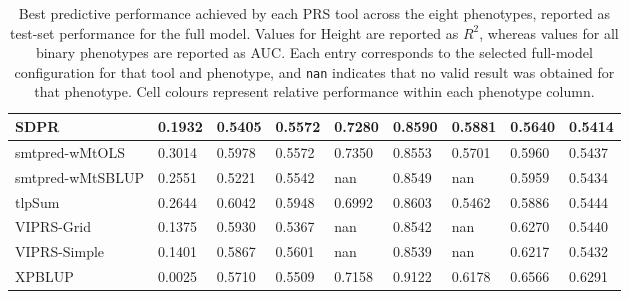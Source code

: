 \documentclass[pdflatex,sn-basic]{sn-jnl}
\begin{document}
\begin{table}[!ht]
{\begin{tabular}{|l|l|l|l|l|l|l|l|l|}
\hline
SDPR \cite{Zhou_2021} & \cellcolor[HTML]{FEE282}0.1932 & \cellcolor[HTML]{FCB87A}0.5405 & \cellcolor[HTML]{FCC27C}0.5572 & \cellcolor[HTML]{B9D780}0.7280 & \cellcolor[HTML]{FEEA83}0.8590 & \cellcolor[HTML]{FDCE7E}0.5881 & \cellcolor[HTML]{FBA175}0.5640 & \cellcolor[HTML]{FEDB81}0.5414 \\
\hline
smtpred-wMtOLS \cite{Maier_2018} & \cellcolor[HTML]{9BCE7F}0.3014 & \cellcolor[HTML]{C6DB81}0.5978 & \cellcolor[HTML]{FCC27C}0.5572 & \cellcolor[HTML]{A1D07F}0.7350 & \cellcolor[HTML]{FEE983}0.8553 & \cellcolor[HTML]{FBA676}0.5701 & \cellcolor[HTML]{FEDC81}0.5960 & \cellcolor[HTML]{FEE983}0.5437 \\
\hline
smtpred-wMtSBLUP \cite{Maier_2018} & \cellcolor[HTML]{CCDD82}0.2551 & \cellcolor[HTML]{FAA075}0.5221 & \cellcolor[HTML]{FCBD7B}0.5542 & nan & \cellcolor[HTML]{FEE983}0.8549 & nan & \cellcolor[HTML]{FEDC81}0.5959 & \cellcolor[HTML]{FEE783}0.5434 \\
\hline
tlpSum \cite{Pattee_2020} & \cellcolor[HTML]{C2DA81}0.2644 & \cellcolor[HTML]{B2D580}0.6042 & \cellcolor[HTML]{E4E483}0.5948 & \cellcolor[HTML]{FEDC81}0.6992 & \cellcolor[HTML]{FFEB84}0.8603 & \cellcolor[HTML]{F8716C}0.5462 & \cellcolor[HTML]{FDCE7E}0.5886 & \cellcolor[HTML]{FFEB84}0.5444 \\
\hline
VIPRS-Grid \cite{Zabad_2023} & \cellcolor[HTML]{FCC17B}0.1375 & \cellcolor[HTML]{D5DF82}0.5930 & \cellcolor[HTML]{FA9E75}0.5367 & nan & \cellcolor[HTML]{FEE883}0.8542 & nan & \cellcolor[HTML]{CFDE82}0.6270 & \cellcolor[HTML]{FFEB84}0.5440 \\
\hline
VIPRS-Simple \cite{Zabad_2023} & \cellcolor[HTML]{FCC27C}0.1401 & \cellcolor[HTML]{E9E583}0.5867 & \cellcolor[HTML]{FDC77D}0.5601 & nan & \cellcolor[HTML]{FEE883}0.8539 & nan & \cellcolor[HTML]{DAE182}0.6217 & \cellcolor[HTML]{FEE683}0.5432 \\
\hline
XPBLUP \cite{Zhang_2023} & \cellcolor[HTML]{F86F6C}0.0025 & \cellcolor[HTML]{FEE081}0.5710 & \cellcolor[HTML]{FCB77A}0.5509 & \cellcolor[HTML]{E2E383}0.7158 & \cellcolor[HTML]{8ECB7E}0.9122 & \cellcolor[HTML]{DAE182}0.6178 & \cellcolor[HTML]{91CC7E}0.6566 & \cellcolor[HTML]{63BE7B}0.6291 \\
\hline
\end{tabular}%
}
\caption{Best predictive performance achieved by each PRS tool across the eight phenotypes, reported as test-set performance for the full model. Values for Height are reported as $R^2$, whereas values for all binary phenotypes are reported as AUC. Each entry corresponds to the selected full-model configuration for that tool and phenotype, and \texttt{nan} indicates that no valid result was obtained for that phenotype. Cell colours represent relative performance within each phenotype column.}
\label{TableBestFullModelSorted}
\end{table}
\end{document}
